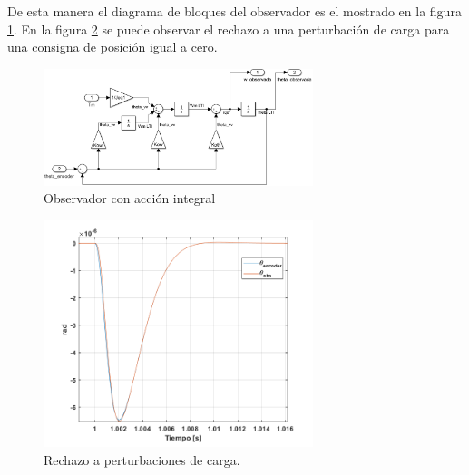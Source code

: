\documentclass[10pt]{article}
\begin{document}
\begin{itemize}
	De esta manera el diagrama de bloques del observador es el mostrado en la figura \ref{fig:observadornuevo}. En la figura \ref{fig:obs} se puede observar el rechazo a una perturbación de carga para una consigna de posición igual a cero.
	\begin{figure}[h!]
		\centering
		\includegraphics[width=0.7\textwidth]{observadornuevo.png}
		\caption{\label{fig:observadornuevo}Observador con acción integral}
		\end{figure}
	
	\begin{figure}[h!]
		\centering
		\includegraphics[width=0.7\textwidth]{obs.png}
		\caption{\label{fig:obs}Rechazo a perturbaciones de carga.}
		\end{figure}


\end{itemize}
\end{document}
